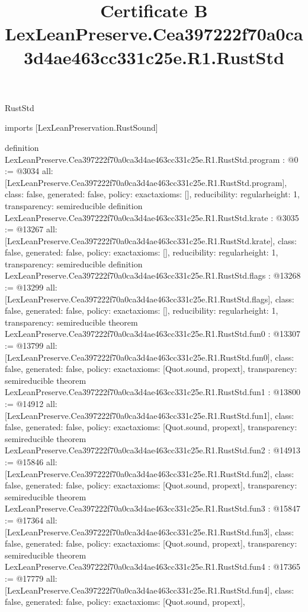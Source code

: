 \begin{lexlean}{RustStd}
\title{Certificate B LexLeanPreserve.Cea397222f70a0ca3d4ae463cc331c25e.R1.RustStd}
\begin{coremodule}
imports [LexLeanPreservation.RustSound]

definition LexLeanPreserve.Cea397222f70a0ca3d4ae463cc331c25e.R1.RustStd.program : @0 := @3034 {
  all: [LexLeanPreserve.Cea397222f70a0ca3d4ae463cc331c25e.R1.RustStd.program],
  class: false,
  generated: false,
  policy: exact{axioms: []},
  reducibility: regular{height: 1},
  transparency: semireducible
}
definition LexLeanPreserve.Cea397222f70a0ca3d4ae463cc331c25e.R1.RustStd.krate : @3035 := @13267 {
  all: [LexLeanPreserve.Cea397222f70a0ca3d4ae463cc331c25e.R1.RustStd.krate],
  class: false,
  generated: false,
  policy: exact{axioms: []},
  reducibility: regular{height: 1},
  transparency: semireducible
}
definition LexLeanPreserve.Cea397222f70a0ca3d4ae463cc331c25e.R1.RustStd.flags : @13268 := @13299 {
  all: [LexLeanPreserve.Cea397222f70a0ca3d4ae463cc331c25e.R1.RustStd.flags],
  class: false,
  generated: false,
  policy: exact{axioms: []},
  reducibility: regular{height: 1},
  transparency: semireducible
}
theorem LexLeanPreserve.Cea397222f70a0ca3d4ae463cc331c25e.R1.RustStd.fun0 : @13307 := @13799 {
  all: [LexLeanPreserve.Cea397222f70a0ca3d4ae463cc331c25e.R1.RustStd.fun0],
  class: false,
  generated: false,
  policy: exact{axioms: [Quot.sound, propext]},
  transparency: semireducible
}
theorem LexLeanPreserve.Cea397222f70a0ca3d4ae463cc331c25e.R1.RustStd.fun1 : @13800 := @14912 {
  all: [LexLeanPreserve.Cea397222f70a0ca3d4ae463cc331c25e.R1.RustStd.fun1],
  class: false,
  generated: false,
  policy: exact{axioms: [Quot.sound, propext]},
  transparency: semireducible
}
theorem LexLeanPreserve.Cea397222f70a0ca3d4ae463cc331c25e.R1.RustStd.fun2 : @14913 := @15846 {
  all: [LexLeanPreserve.Cea397222f70a0ca3d4ae463cc331c25e.R1.RustStd.fun2],
  class: false,
  generated: false,
  policy: exact{axioms: [Quot.sound, propext]},
  transparency: semireducible
}
theorem LexLeanPreserve.Cea397222f70a0ca3d4ae463cc331c25e.R1.RustStd.fun3 : @15847 := @17364 {
  all: [LexLeanPreserve.Cea397222f70a0ca3d4ae463cc331c25e.R1.RustStd.fun3],
  class: false,
  generated: false,
  policy: exact{axioms: [Quot.sound, propext]},
  transparency: semireducible
}
theorem LexLeanPreserve.Cea397222f70a0ca3d4ae463cc331c25e.R1.RustStd.fun4 : @17365 := @17779 {
  all: [LexLeanPreserve.Cea397222f70a0ca3d4ae463cc331c25e.R1.RustStd.fun4],
  class: false,
  generated: false,
  policy: exact{axioms: [Quot.sound, propext]},
}
\end{coremodule}
\end{lexlean}
